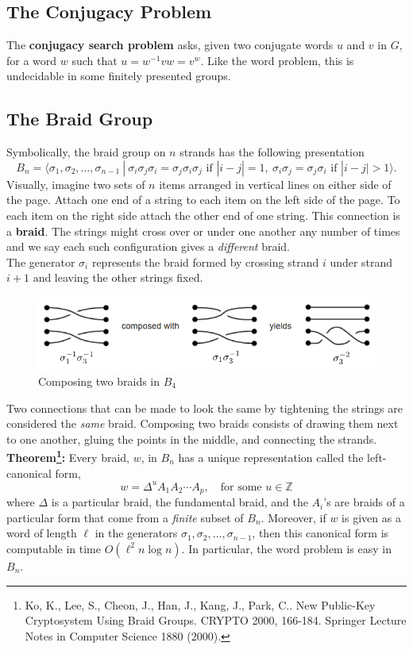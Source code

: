 \documentclass[11pt]{article}
\newcommand{\integers}{\mathbb{Z}}
\begin{document}
\subsection*{The Conjugacy Problem}
The \textbf{conjugacy search problem} asks, given two conjugate words $u$ and $v$ in $G$, for a word $w$ such that $u = w^{-1}vw = v^w$. Like the word problem, this is undecidable in some finitely presented groups.

\subsection*{The Braid Group}
Symbolically, the braid group on $n$ strands has the following presentation
\[
B_n = \langle \sigma_1, \sigma_2, \ldots, \sigma_{n-1}\ |\  \sigma_i\sigma_j\sigma_i = \sigma_j\sigma_i\sigma_j\text{ if }|i-j| = 1,\ \sigma_i\sigma_j = \sigma_j\sigma_i\text{ if }|i-j|>1\rangle.
\]
Visually, imagine two sets of $n$ items arranged in vertical lines on either side of the page. Attach one end of a string to each item on the left side of the page. To each item on the right side attach the other end of one string. This connection is a \textbf{braid}. The strings might cross over or under one another any number of times and we say each such configuration gives a \textit{different} braid.\\
\indent The generator $\sigma_i$ represents the braid formed by crossing strand $i$ under strand $i+1$ and leaving the other strings fixed.
\begin{figure}[h]
\centering
	\includegraphics[scale=.61]{composition.PNG}
\caption{Composing two braids in $B_4$}
\end{figure}

\indent Two connections that can be made to look the same by tightening the strings are considered the \textit{same} braid. Composing two braids consists of drawing them next to one another, gluing the points in the middle, and connecting the strands.\\


\noindent \textbf{Theorem\footnote{Ko, K., Lee, S., Cheon, J., Han, J., Kang, J., Park, C.. New Public-Key Cryptosystem Using Braid Groups. CRYPTO 2000, 166-184. Springer Lecture Notes in Computer Science 1880 (2000).}: }Every braid, $w$, in $B_n$ has a unique representation called the left-canonical form,
\[
w = \Delta^uA_1A_2\cdots A_p,\quad \text{for some }u\in \integers
\]
where $\Delta$ is a particular braid, the fundamental braid, and the $A_i$'s are braids of a particular form that come from a \textit{finite} subset of $B_n$. Moreover, if $w$ is given as a word of length $\ell$ in the generators $\sigma_1, \sigma_2, \ldots, \sigma_{n-1}$, then this canonical form is computable in time $O(\ell^2n\log n)$. In particular, the word problem is easy in $B_n$.
\end{document}
